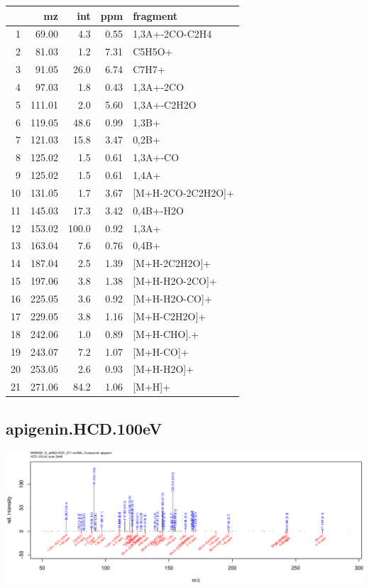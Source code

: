\documentclass[]{article}
\begin{document}
\begin{table}[ht]
\centering
\begin{tabular}{rrrrl}
  \toprule
 & mz & int & ppm & fragment \\ 
  \midrule
1 & 69.00 & 4.3 & 0.55 & 1,3A+-2CO-C2H4 \\ 
  2 & 81.03 & 1.2 & 7.31 & C5H5O+ \\ 
  3 & 91.05 & 26.0 & 6.74 & C7H7+ \\ 
  4 & 97.03 & 1.8 & 0.43 & 1,3A+-2CO \\ 
  5 & 111.01 & 2.0 & 5.60 & 1,3A+-C2H2O \\ 
  6 & 119.05 & 48.6 & 0.99 & 1,3B+ \\ 
  7 & 121.03 & 15.8 & 3.47 & 0,2B+ \\ 
  8 & 125.02 & 1.5 & 0.61 & 1,3A+-CO \\ 
  9 & 125.02 & 1.5 & 0.61 & 1,4A+ \\ 
  10 & 131.05 & 1.7 & 3.67 & [M+H-2CO-2C2H2O]+ \\ 
  11 & 145.03 & 17.3 & 3.42 & 0,4B+-H2O \\ 
  12 & 153.02 & 100.0 & 0.92 & 1,3A+ \\ 
  13 & 163.04 & 7.6 & 0.76 & 0,4B+ \\ 
  14 & 187.04 & 2.5 & 1.39 & [M+H-2C2H2O]+ \\ 
  15 & 197.06 & 3.8 & 1.38 & [M+H-H2O-2CO]+ \\ 
  16 & 225.05 & 3.6 & 0.92 & [M+H-H2O-CO]+ \\ 
  17 & 229.05 & 3.8 & 1.16 & [M+H-C2H2O]+ \\ 
  18 & 242.06 & 1.0 & 0.89 & [M+H-CHO].+ \\ 
  19 & 243.07 & 7.2 & 1.07 & [M+H-CO]+ \\ 
  20 & 253.05 & 2.6 & 0.93 & [M+H-H2O]+ \\ 
  21 & 271.06 & 84.2 & 1.06 & [M+H]+ \\ 
   \bottomrule
\end{tabular}
\end{table}

\clearpage\subsection{apigenin.HCD.100eV}
\includegraphics[width=\textwidth]{WEB350_files/figure-latex/unnamed-chunk-3-15}
\end{document}
